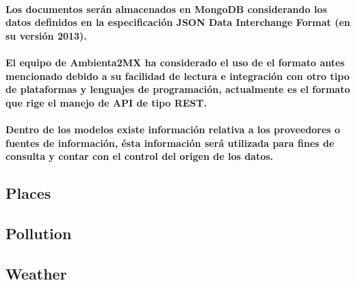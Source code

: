 \paragraph{Los documentos serán almacenados en MongoDB considerando los datos definidos en la especificación JSON Data Interchange Format (en su versión 2013). \cite{16}}

\paragraph{El equipo de Ambienta2MX ha considerado el uso de el formato antes mencionado debido a su facilidad de lectura e integración con otro tipo de plataformas y lenguajes de programación, actualmente es el formato que rige el manejo de API de tipo REST.}

\paragraph{Dentro de los modelos existe información relativa a los proveedores o fuentes de información, ésta información será utilizada para fines de consulta y contar con el control del origen de los datos.}
\newpage
\subsection{Places}
   
\newpage
\subsection{Pollution}
   
\newpage
\subsection{Weather}
   

